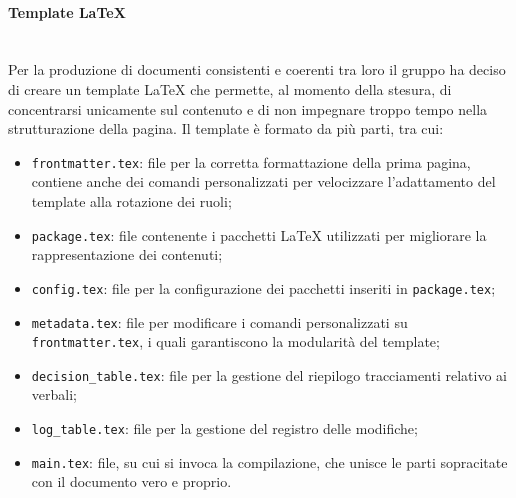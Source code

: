 	        \paragraph*{Template \LaTeX}\mbox{}\\ [1mm]
	            Per la produzione di documenti consistenti e coerenti tra loro il gruppo ha deciso di creare un template \LaTeX \xspace che permette, al momento della stesura, di concentrarsi unicamente sul contenuto e di non impegnare troppo tempo nella strutturazione della pagina. Il template è formato da
	            più parti, tra cui:
	            \begin{itemize}
	                \item \verb|frontmatter.tex|: file per la corretta formattazione della prima pagina, contiene anche dei comandi personalizzati per velocizzare l'adattamento del template alla rotazione dei ruoli;
	                \item \verb|package.tex|: file contenente i pacchetti \LaTeX \xspace utilizzati per migliorare la rappresentazione dei contenuti;
	                \item \verb|config.tex|: file per la configurazione dei pacchetti inseriti in \verb|package.tex|;
	                \item \verb|metadata.tex|: file per modificare i comandi personalizzati su \verb|frontmatter.tex|, i quali garantiscono la modularità del template;
	                \item \verb|decision_table.tex|: file per la gestione del riepilogo tracciamenti relativo ai verbali;
	                \item \verb|log_table.tex|: file per la gestione del registro delle modifiche;
	                \item \verb|main.tex|: file, su cui si invoca la compilazione, che unisce le parti sopracitate con il documento vero e proprio.
	            \end{itemize}
